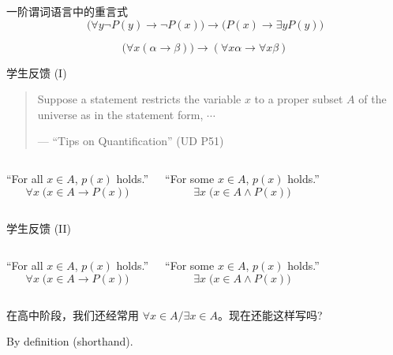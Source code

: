 \begin{frame}{一阶谓词语言中的重言式}
  \pause
  \[
    \Big(\forall y \lnot P(y) \to \lnot P(x)\Big) \to \Big(P(x) \to \exists y P(y)\Big)
  \]

  \[
    \Big(\forall x (\alpha \to \beta)\Big) \to (\forall x \alpha \to \forall x \beta)
  \]
\end{frame}


\begin{frame}{学生反馈 (I)}
  \begin{quote}
    Suppose a statement restricts the variable $x$ to a proper subset $A$
    of the universe as in the statement form, $\cdots$

    \hfill --- ``Tips on Quantification'' (UD P51)
  \end{quote}
  
  \vspace{0.60cm}
  \begin{columns}
      ``For all $x \in A$, $p(x)$ holds.''
      \[
	\forall x \; \Big(x \in A \to P(x)\Big)
      \]

      ``For some $x \in A$, $p(x)$ holds.''
      \[
	\exists x \; \Big(x \in A \land P(x)\Big)
      \]

  \end{columns}

  \vspace{0.30cm}
  \centerline{}
\end{frame}

\begin{frame}{学生反馈 (II)}
  \begin{columns}
      ``For all $x \in A$, $p(x)$ holds.''
      \[
	\forall x \; \Big(x \in A \to P(x)\Big)
      \]

      ``For some $x \in A$, $p(x)$ holds.''
      \[
	\exists x \; \Big(x \in A \land P(x)\Big)
      \]

  \end{columns}

  \vspace{0.30cm}
  \centerline{ 在高中阶段，我们还经常用 $\forall x \in A/\exists x \in A$。现在还能这样写吗?}

  \pause
  \vspace{0.60cm}
  \centerline{By definition (shorthand).}
\end{frame}


